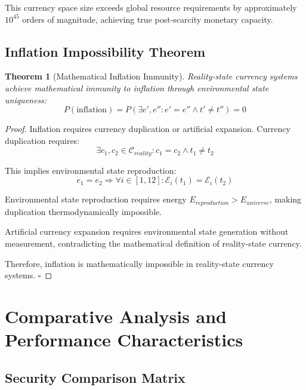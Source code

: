 \documentclass[12pt,a4paper]{article}
\newtheorem{theorem}{Theorem}
\begin{document}
This currency space size exceeds global resource requirements by approximately $10^{45}$ orders of magnitude, achieving true post-scarcity monetary capacity.

\subsection{Inflation Impossibility Theorem}

\begin{theorem}[Mathematical Inflation Immunity]
Reality-state currency systems achieve mathematical immunity to inflation through environmental state uniqueness:
\begin{equation}
P(\text{inflation}) = P(\exists e', e'' : e' = e'' \land t' \neq t'') = 0
\end{equation}
\end{theorem}

\begin{proof}
Inflation requires currency duplication or artificial expansion. Currency duplication requires:
\begin{equation}
\exists c_1, c_2 \in \mathcal{C}_{reality} : c_1 = c_2 \land t_1 \neq t_2
\end{equation}

This implies environmental state reproduction:
\begin{equation}
e_1 = e_2 \Rightarrow \forall i \in [1,12] : \mathcal{E}_i(t_1) = \mathcal{E}_i(t_2)
\end{equation}

Environmental state reproduction requires energy $E_{reproduction} > E_{universe}$, making duplication thermodynamically impossible.

Artificial currency expansion requires environmental state generation without measurement, contradicting the mathematical definition of reality-state currency.

Therefore, inflation is mathematically impossible in reality-state currency systems. $\square$
\end{proof}

\section{Comparative Analysis and Performance Characteristics}

\subsection{Security Comparison Matrix}
\end{document}
